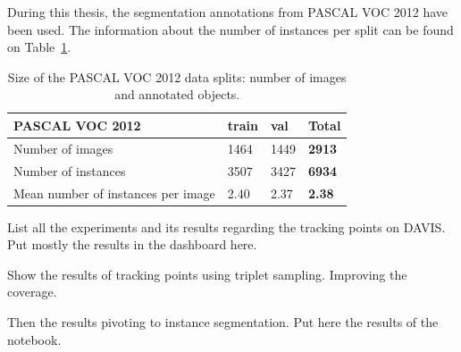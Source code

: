 During this thesis, the segmentation annotations from PASCAL VOC 2012 have been used. The information about the number of instances per split can be found on Table~\ref{table:pascal}.

\begin{table}[h]
\centering
\begin{tabular}{l|lll}
PASCAL VOC 2012                    & train & val  & \textbf{Total} \\
\hline
Number of images                & 1464    & 1449   & \textbf{2913}    \\
Number of instances           & 3507 & 3427 & \textbf{6934} \\
Mean number of instances per image & 2.40  & 2.37 & \textbf{2.38}  \\
\end{tabular}
\caption{Size of the PASCAL VOC 2012 data splits: number of images and annotated objects.}
\label{table:pascal}
\end{table}




List all the experiments and its results regarding the tracking points on DAVIS\@.
Put mostly the results in the dashboard here.

Show the results of tracking points using triplet sampling. Improving the coverage.

Then the results pivoting to instance segmentation. Put here the results of the notebook.

